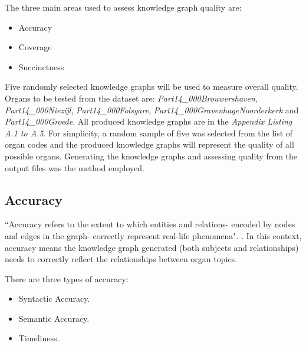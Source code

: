The three main areas used to assess knowledge graph quality are: 

\vspace{-0.2cm}
\begin{itemize}
    \itemsep0em 
    \item Accuracy
    \vspace{-0.15cm}
    \item Coverage
    \vspace{-0.15cm}
    \item Succinctness
\end{itemize}
\vspace{-0.1cm}

Five randomly selected knowledge graphs will be used to measure overall quality. Organs to be tested from the dataset are: \textit{Part14\_000Brouwershaven}, \textit{Part14\_000Niezijl}, \textit{Part14\_000Folsgare}, \textit{Part14\_000GravenhageNoorderkerk} and \textit{Part14\_000Groede}. All produced knowledge graphs are in the \textit{Appendix Listing A.1 to A.5}. For simplicity, a random sample of five was selected from the list of organ codes and the produced knowledge graphs will represent the quality of all possible organs. Generating the knowledge graphs and assessing quality from the output files was the method employed. 

\subsection{Accuracy}
\hspace{0.5cm} ``Accuracy refers to the extent to which entities and relations- encoded by nodes and edges in the graph- correctly represent real-life phenomena". \cite{knowledgegraphevaulationbook}. In this context, accuracy means the knowledge graph generated (both subjects and relationships) needs to correctly reflect the relationships between organ topics. 

There are three types of accuracy: 

\vspace{-0.2cm}
\begin{itemize}
    \itemsep0em 
\item Syntactic Accuracy.
\vspace{-0.1cm}
\item Semantic Accuracy.
\vspace{-0.1cm}
\item Timeliness.
\end{itemize}
\vspace{-0.4cm}


